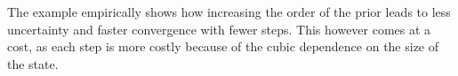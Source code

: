 {\begin{center}
    \end{center}
}
The example empirically shows how increasing the order of the prior leads to less uncertainty and faster convergence with fewer steps. This however comes at a cost, as each step is more costly because of the cubic dependence on the size of the state.






\ifdefined\COMPILINGFROMMAIN
\else    
    
\fi